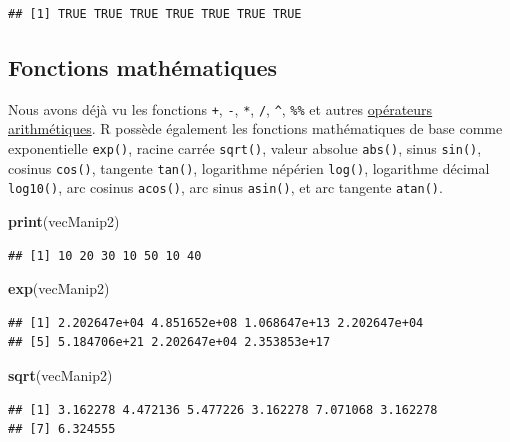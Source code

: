 \documentclass[twoside,symmetric]{book}
\newenvironment{Shaded}{}{}
\newcommand{\KeywordTok}[1]{\textbf{#1}}
\newcommand{\NormalTok}[1]{#1}
\begin{document}
\begin{verbatim}
## [1] TRUE TRUE TRUE TRUE TRUE TRUE TRUE
\end{verbatim}

\hypertarget{fonctions-mathuxe9matiques}{%
\subsection{Fonctions mathématiques}\label{fonctions-mathuxe9matiques}}

Nous avons déjà vu les fonctions \texttt{+}, \texttt{-}, \texttt{*}, \texttt{/}, \texttt{\^{}}, \texttt{\%\%} et autres \protect\hyperlink{l011opari}{opérateurs arithmétiques}. R possède également les fonctions mathématiques de base comme exponentielle \texttt{exp()}, racine carrée \texttt{sqrt()}, valeur absolue \texttt{abs()}, sinus \texttt{sin()}, cosinus \texttt{cos()}, tangente \texttt{tan()}, logarithme népérien \texttt{log()}, logarithme décimal \texttt{log10()}, arc cosinus \texttt{acos()}, arc sinus \texttt{asin()}, et arc tangente \texttt{atan()}.

\begin{Shaded}
\begin{Highlighting}[]
\KeywordTok{print}\NormalTok{(vecManip2)}
\end{Highlighting}
\end{Shaded}

\begin{verbatim}
## [1] 10 20 30 10 50 10 40
\end{verbatim}

\begin{Shaded}
\begin{Highlighting}[]
\KeywordTok{exp}\NormalTok{(vecManip2)}
\end{Highlighting}
\end{Shaded}

\begin{verbatim}
## [1] 2.202647e+04 4.851652e+08 1.068647e+13 2.202647e+04
## [5] 5.184706e+21 2.202647e+04 2.353853e+17
\end{verbatim}

\begin{Shaded}
\begin{Highlighting}[]
\KeywordTok{sqrt}\NormalTok{(vecManip2)}
\end{Highlighting}
\end{Shaded}

\begin{verbatim}
## [1] 3.162278 4.472136 5.477226 3.162278 7.071068 3.162278
## [7] 6.324555
\end{verbatim}
\end{document}
